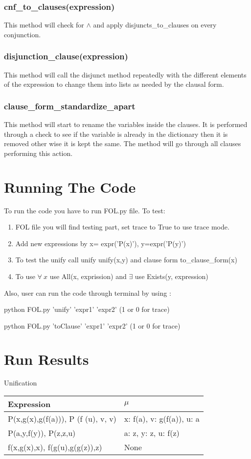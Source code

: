\subsubsection{cnf\_to\_clauses(expression)}
This method will check for $\wedge$ and apply disjuncts\_to\_clauses on every conjunction.
\subsubsection{disjunction\_clause(expression)}
This method will call the disjunct method repeatedly with the different elements of the expression to change them into lists as needed by the clausal form.
\subsubsection{clause\_form\_standardize\_apart}
This method will start to rename the variables inside the clauses. It is performed through a check to see if the variable is already in the dictionary then it is removed other wise it is kept the same. The method will go through all clauses performing this action.
\section{Running The Code}
To run the code you have to run FOL.py file.
To test:
\begin{enumerate}
\item FOL file you will find testing part, set trace to True to use
trace mode.
\item Add new expressions by x= expr('P(x)'), y=expr('P(y)')
\item To test the unify call unify unify(x,y) and clause form
to\_clause\_form(x)
\item To use $\forall\ x$ use All(x, exprission)  and $\exists$ use Exists(y,
expression)
\end{enumerate}

Also, user can run the code through terminal by using :
\begin{description}
\item python FOL.py 'unify' 'expr1' 'expr2' (1 or 0 for trace) 
\item python FOL.py 'toClause' 'expr1' 'expr2' (1 or 0 for trace)
\end{description}
 

\section{Run Results}
\begin{center}
Unification
\end{center}
\begin{table}[H]
\begin{tabular}{| p{7cm}  | p{7cm} | }
 \hline
Expression  & $\mu$
\\ \hline
P(x,g(x),g(f(a))), P (f (u), v, v) & x: f(a), v: g(f(a)), u: a
\\ \hline
P(a,y,f(y)), P(z,z,u) & a: z, y: z, u: f(z)
\\ \hline
f(x,g(x),x), f(g(u),g(g(z)),z) & None
\\ \hline
\end{tabular}
\end{table}

